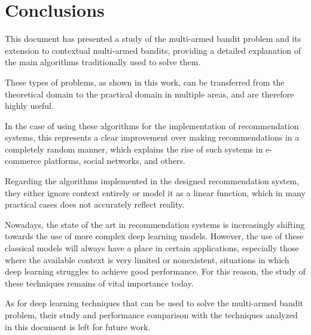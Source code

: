 \documentclass[../main.tex]{subfiles}
\begin{document}
\chapter{Conclusions}\label{ch:conclusions}

This document has presented a study of the multi-armed bandit problem and its extension 
to contextual multi-armed bandits, providing a detailed explanation of the main algorithms 
traditionally used to solve them.  

These types of problems, as shown in this work, can be transferred from the theoretical 
domain to the practical domain in multiple areas, and are therefore highly useful.  

In the case of using these algorithms for the implementation of recommendation systems, 
this represents a clear improvement over making recommendations in a completely random 
manner, which explains the rise of such systems in e-commerce platforms, social networks, 
and others.  

Regarding the algorithms implemented in the designed recommendation system, they either 
ignore context entirely or model it as a linear function, which in many practical cases 
does not accurately reflect reality.  

Nowadays, the state of the art in recommendation systems is increasingly shifting towards 
the use of more complex deep learning models. However, the use of these classical models 
will always have a place in certain applications, especially those where the available 
context is very limited or nonexistent, situations in which deep learning struggles to 
achieve good performance. For this reason, the study of these techniques remains of vital 
importance today.  

As for deep learning techniques that can be used to solve the multi-armed bandit problem, 
their study and performance comparison with the techniques analyzed in this document is 
left for future work.  
\end{document}

